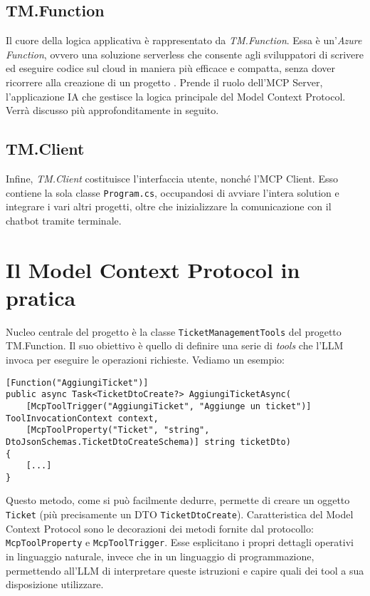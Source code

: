 \subsection{TM.Function}
Il cuore della logica applicativa è rappresentato da \textit{TM.Function}. Essa è un'\textit{Azure Function}, ovvero una soluzione serverless
che consente agli sviluppatori di scrivere ed eseguire codice sul cloud in maniera più efficace e compatta, senza dover ricorrere alla
creazione di un progetto \cite{azurefunctions_msdocs}. Prende il ruolo dell'MCP Server, l'applicazione IA che gestisce la logica principale del
Model Context Protocol. Verrà discusso più approfonditamente in seguito.

\subsection{TM.Client}
Infine, \textit{TM.Client} costituisce l'interfaccia utente, nonché l'MCP Client. Esso contiene la sola classe \texttt{Program.cs}, occupandosi
di avviare l'intera solution e integrare i vari altri progetti, oltre che inizializzare la comunicazione con il chatbot tramite terminale.

\newpage
\section{Il Model Context Protocol in pratica}
Nucleo centrale del progetto è la classe \texttt{TicketManagementTools} del progetto TM.Function. Il suo obiettivo è quello di definire una serie
di \textit{tools} che l'LLM invoca per eseguire le operazioni richieste. Vediamo un esempio:

\begin{scriptsize}
\begin{verbatim}
[Function("AggiungiTicket")]
public async Task<TicketDtoCreate?> AggiungiTicketAsync(
    [McpToolTrigger("AggiungiTicket", "Aggiunge un ticket")] ToolInvocationContext context,
    [McpToolProperty("Ticket", "string", DtoJsonSchemas.TicketDtoCreateSchema)] string ticketDto)
{
    [...]
}
\end{verbatim}
\end{scriptsize}

Questo metodo, come si può facilmente dedurre, permette di creare un oggetto \texttt{Ticket} (più precisamente un DTO \texttt{TicketDtoCreate}).
Caratteristica del Model Context Protocol sono le decorazioni dei metodi fornite dal protocollo: \texttt{McpToolProperty} e \texttt{McpToolTrigger}. 
Esse esplicitano i propri dettagli operativi in linguaggio naturale, invece che in un linguaggio di programmazione, permettendo all'LLM di interpretare 
queste istruzioni e capire quali dei tool a sua disposizione utilizzare.

